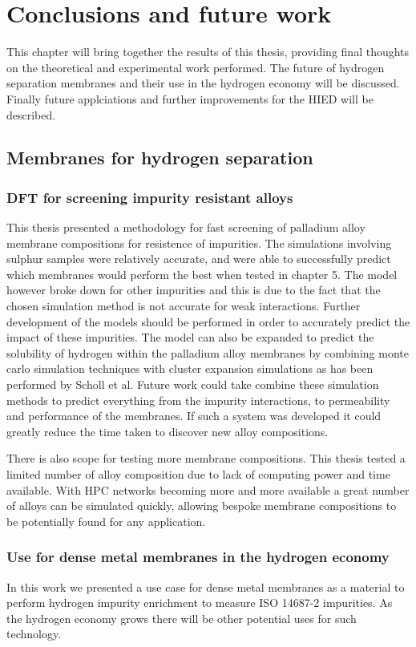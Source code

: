 \chapter{Conclusions and future work}
This chapter will bring together the results of this thesis, providing final thoughts on the theoretical and experimental work performed. The future of hydrogen separation membranes and their use in the hydrogen economy will be discussed. Finally future applciations and further improvements for the HIED will be described.

\section{Membranes for hydrogen separation}
\subsection{DFT for screening impurity resistant alloys}\label{simconc}
This thesis presented a methodology for fast screening of palladium alloy membrane compositions for resistence of impurities. The simulations involving sulphur samples were relatively accurate, and were able to successfully predict which membranes would perform the best when tested in chapter 5. The model however broke down for other impurities and this is due to the fact that the chosen simulation method is not accurate for weak interactions. \cite{dftbook1} Further development of the models should be performed in order to accurately predict the impact of these impurities. The model can also be expanded to predict the solubility of hydrogen within the palladium alloy membranes by combining monte carlo simulation techniques with cluster expansion simulations as has been performed by Scholl et al. \cite{SHOLL2007462} Future work could take combine these simulation methods to predict everything from the impurity interactions, to permeability and performance of the membranes. If such a system was developed it could greatly reduce the time taken to discover new alloy compositions. 

There is also scope for testing more membrane compositions. This thesis tested a limited number of alloy composition due to lack of computing power and time available. With HPC networks becoming more and more available \cite{morgan_burt_feldman_2020} a great number of alloys can be simulated quickly, allowing bespoke membrane compositions to be potentially found for any application. 

\subsection{Use for dense metal membranes in the hydrogen economy}
In this work we presented a use case for dense metal membranes as a material to perform hydrogen impurity enrichment to measure ISO 14687-2 impurities. As the hydrogen economy grows there will be other potential uses for such technology. 

